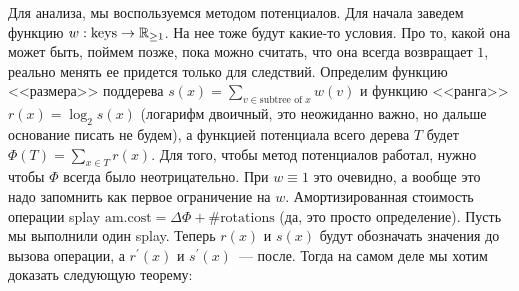 Для анализа, мы воспользуемся методом потенциалов. Для начала заведем функцию $w: \text{keys} \to {\mathbb R}_{\geq 1}$. На нее тоже будут какие-то условия. Про то, какой она может быть, поймем позже, пока можно считать, что она всегда возвращает $1$, реально менять ее придется только для следствий. Определим функцию <<размера>> поддерева $s(x) = \sum_{v \in \text{subtree of } x} w(v)$ и функцию <<ранга>> $r(x) = \log_2 s(x)$ (логарифм двоичный, это неожиданно важно, но дальше основание писать не будем), а функцией потенциала всего дерева $T$ будет $\Phi(T) = \sum_{x \in T} r(x)$. Для того, чтобы метод потенциалов работал, нужно чтобы $\Phi$ всегда было неотрицательно. При $w \equiv 1$ это очевидно, а вообще это надо запомнить как первое ограничение на $w$. Амортизированная стоимость операции splay $\text{am.cost} = \Delta\Phi + \#\text{rotations}$ (да, это просто определение). Пусть мы выполнили один splay. Теперь $r(x)$ и $s(x)$ будут обозначать значения до вызова операции, а $r^\prime(x)$ и $s^\prime(x)$~--- после. Тогда на самом деле мы хотим доказать следующую теорему:

